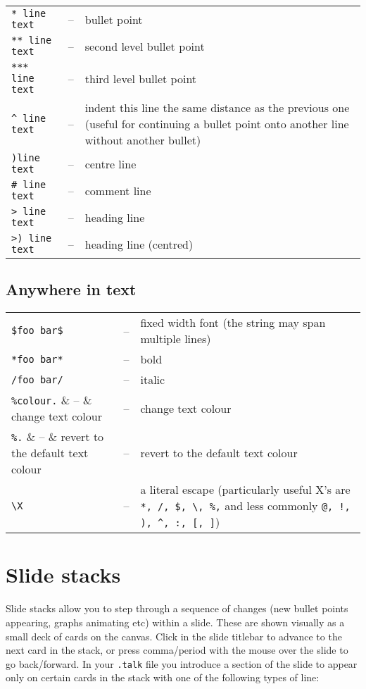 \documentclass[12pt,a4paper,twoside]{article}
\renewcommand{\_}{\texttt{\symbol{95}}}
\begin{document}
\begin{tabular}{llp{12cm}}
\verb^* line text^   & -- & bullet point\\
\verb^** line text^  & -- & second level bullet point\\
\verb^*** line text^ & -- & third level bullet point\\
\verb/^ line text/   & -- & indent this line the same distance as the
	previous one (useful for continuing a bullet point onto another line
	without another bullet)\\
\verb^)line text^    & -- & centre line\\
\verb^# line text^   & -- & comment line\\
\verb^> line text^   & -- & heading line\\
\verb^>) line text^   & -- & heading line (centred)\\
\end{tabular}

\subsection*{Anywhere in text}

\begin{tabular}{llp{13cm}}
\verb^$foo bar$^  & -- & fixed width font (the string may span multiple lines)\\
\verb^*foo bar*^  & -- & bold\\
\verb^/foo bar/^  & -- & italic\\
\verb^%colour.^	& -- & change text colour\\
\verb^%.^			& -- & revert to the default text colour\\
\verb^\X^			& -- & a literal escape (particularly useful X's are
	\verb^*, /, $, \, %,^ and less commonly \verb$@, !, ), ^, :, [, ]$)\\
\end{tabular}

\section{Slide stacks}

Slide stacks allow you to step through a sequence of changes
(new bullet points appearing, graphs animating etc) within a slide.
These are shown visually as a small deck of cards on the canvas.
Click in the slide titlebar to advance to the next card in the stack,
or press comma/period with the mouse over the slide to go back/forward.
In your \verb=.talk= file you introduce a section of the slide to appear only
on certain cards in the stack with one of the following types of line:
\end{document}
